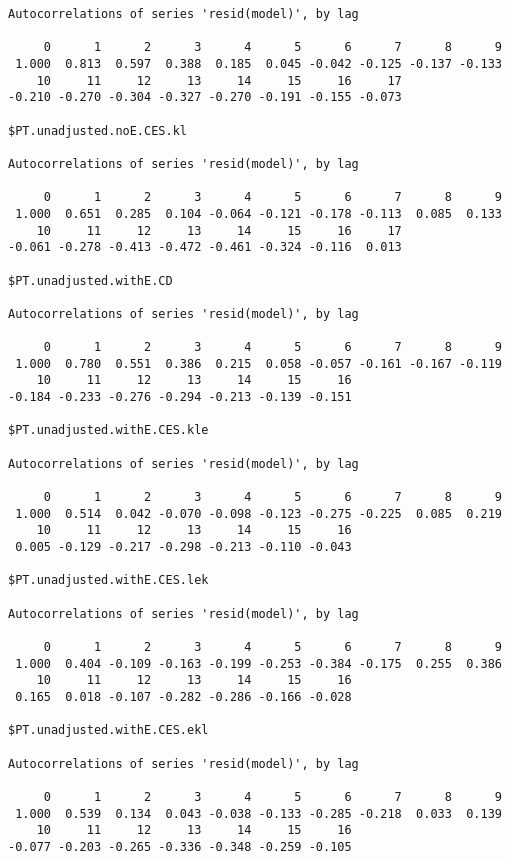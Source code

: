 \documentclass[preprint,authoryear,12pt]{elsarticle}\usepackage[]{graphicx}\usepackage[]{color}
\makeatletter
\newenvironment{kframe}{%
 \def\at@end@of@kframe{}%
 \ifinner\ifhmode%
  \def\at@end@of@kframe{\end{minipage}}%
  \begin{minipage}{\columnwidth}%
 \fi\fi%
 \def\FrameCommand##1{\hskip\@totalleftmargin \hskip-\fboxsep
 \colorbox{shadecolor}{##1}\hskip-\fboxsep
     \hskip-\linewidth \hskip-\@totalleftmargin \hskip\columnwidth}%
 \MakeFramed {\advance\hsize-\width
   \@totalleftmargin\z@ \linewidth\hsize
   \@setminipage}}%
 {\par\unskip\endMakeFramed%
 \at@end@of@kframe}
\newenvironment{knitrout}{}{} %
\makeatother
\begin{document}
\begin{knitrout}
\begin{kframe}
\begin{verbatim}
Autocorrelations of series 'resid(model)', by lag

     0      1      2      3      4      5      6      7      8      9 
 1.000  0.813  0.597  0.388  0.185  0.045 -0.042 -0.125 -0.137 -0.133 
    10     11     12     13     14     15     16     17 
-0.210 -0.270 -0.304 -0.327 -0.270 -0.191 -0.155 -0.073 

$PT.unadjusted.noE.CES.kl

Autocorrelations of series 'resid(model)', by lag

     0      1      2      3      4      5      6      7      8      9 
 1.000  0.651  0.285  0.104 -0.064 -0.121 -0.178 -0.113  0.085  0.133 
    10     11     12     13     14     15     16     17 
-0.061 -0.278 -0.413 -0.472 -0.461 -0.324 -0.116  0.013 

$PT.unadjusted.withE.CD

Autocorrelations of series 'resid(model)', by lag

     0      1      2      3      4      5      6      7      8      9 
 1.000  0.780  0.551  0.386  0.215  0.058 -0.057 -0.161 -0.167 -0.119 
    10     11     12     13     14     15     16 
-0.184 -0.233 -0.276 -0.294 -0.213 -0.139 -0.151 

$PT.unadjusted.withE.CES.kle

Autocorrelations of series 'resid(model)', by lag

     0      1      2      3      4      5      6      7      8      9 
 1.000  0.514  0.042 -0.070 -0.098 -0.123 -0.275 -0.225  0.085  0.219 
    10     11     12     13     14     15     16 
 0.005 -0.129 -0.217 -0.298 -0.213 -0.110 -0.043 

$PT.unadjusted.withE.CES.lek

Autocorrelations of series 'resid(model)', by lag

     0      1      2      3      4      5      6      7      8      9 
 1.000  0.404 -0.109 -0.163 -0.199 -0.253 -0.384 -0.175  0.255  0.386 
    10     11     12     13     14     15     16 
 0.165  0.018 -0.107 -0.282 -0.286 -0.166 -0.028 

$PT.unadjusted.withE.CES.ekl

Autocorrelations of series 'resid(model)', by lag

     0      1      2      3      4      5      6      7      8      9 
 1.000  0.539  0.134  0.043 -0.038 -0.133 -0.285 -0.218  0.033  0.139 
    10     11     12     13     14     15     16 
-0.077 -0.203 -0.265 -0.336 -0.348 -0.259 -0.105 


\end{verbatim}
\end{kframe}
\end{knitrout}
\end{document}
